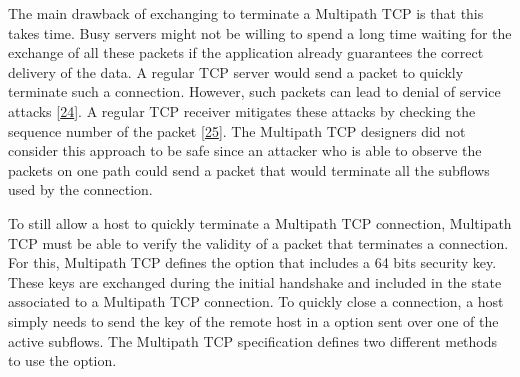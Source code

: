 \documentclass[letterpaper,10pt,english]{sphinxmanual}
\begin{document}
\sphinxAtStartPar
The main drawback of exchanging  to terminate a Multipath TCP is that this takes time. Busy servers might not be willing to spend a long time waiting for the exchange of all these packets if the application already guarantees the correct delivery of the data. A regular TCP server would send a  packet to quickly terminate such a connection. However, such  packets can lead to denial of service attacks {[}\hyperlink{cite.biblio:id5818}{24}{]}. A regular TCP receiver mitigates these attacks by checking the sequence number of the  packet {[}\hyperlink{cite.biblio:id5558}{25}{]}. The Multipath TCP designers did not consider this approach to be safe since an attacker who is able to observe the packets on one path could send a  packet that would terminate all the subflows used by the connection.

\sphinxAtStartPar
To still allow a host to quickly terminate a Multipath TCP connection, Multipath TCP must be able to verify the validity of a packet that terminates a connection. For this, Multipath TCP defines the  option that includes a 64 bits security key. These keys are exchanged during the initial handshake and included in the state associated to a Multipath TCP connection. To quickly close a connection, a host simply needs to send the key of the remote host in a  option sent over one of the active subflows. The Multipath TCP specification defines two different methods to use the  option.
\end{document}
